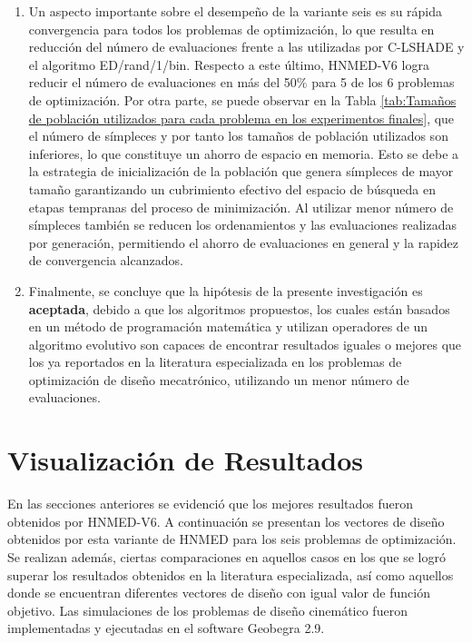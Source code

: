 \begin{enumerate}
  \item Un aspecto importante sobre el desempeño de la variante seis es su rápida convergencia para todos los problemas de optimización, lo que resulta en reducción del número de evaluaciones frente a las utilizadas por C-LSHADE y el algoritmo ED/rand/1/bin. Respecto a este último, HNMED-V6 logra reducir el número de evaluaciones en más del 50\% para 5 de los 6 problemas de optimización. Por otra parte, se puede observar en la Tabla \ref{tab:Tamaños de población utilizados para cada problema en los experimentos finales}, que el número de símpleces y por tanto los tamaños de población utilizados son inferiores, lo que constituye un ahorro de espacio en memoria. Esto se debe a la estrategia de inicialización de la población que genera símpleces de mayor tamaño  garantizando un cubrimiento efectivo del espacio de búsqueda en etapas tempranas del proceso de minimización. Al utilizar menor número de símpleces también se reducen los ordenamientos y las evaluaciones realizadas por generación, permitiendo el ahorro de evaluaciones en general y la rapidez de convergencia alcanzados.

\item Finalmente, se concluye que la hipótesis de la presente investigación es \textbf{aceptada}, debido a que los algoritmos propuestos, los cuales están basados en un método de programación matemática y utilizan operadores de un algoritmo evolutivo son capaces de encontrar resultados iguales o mejores que los ya reportados en la literatura especializada en los problemas de optimización de diseño mecatrónico, utilizando un menor número de evaluaciones.
\end{enumerate}

\section{Visualización de Resultados}
En las secciones anteriores se evidenció que los mejores resultados fueron obtenidos por HNMED-V6. A continuación se presentan los vectores de diseño obtenidos por esta variante de HNMED para los seis problemas de optimización. Se realizan además, ciertas comparaciones en aquellos casos en los que se logró superar los resultados obtenidos en la literatura especializada, así como aquellos donde se encuentran diferentes vectores de diseño con igual valor de función objetivo. Las simulaciones de los problemas de diseño cinemático fueron implementadas y ejecutadas en el software Geobegra 2.9.
